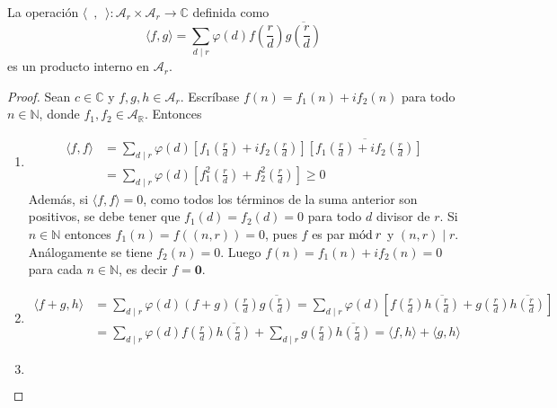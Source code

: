 \begin{proposition}
La operación $\langle \phantom{f},\phantom{g} \rangle : \mathcal{A}_r\times \mathcal{A}_r \longrightarrow \mathbb{C}$ definida como
\begin{equation*}
    \langle f,g \rangle = \sum_{d \mid r} \varphi(d) f \left( \frac{r}{d} \right) \overline{g \left( \frac{r}{d} \right)}
\end{equation*}
es un producto interno en $\mathcal{A}_r$.
\end{proposition}
\begin{proof}
Sean $c \in \mathbb{C}$ y $f,g,h \in \mathcal{A}_r$. Escríbase $f(n)=f_1(n)+ i f_2(n)$ para todo $n \in \mathbb{N}$, donde $f_1,f_2 \in \mathcal{A}_{\mathbb{R}}$. Entonces
\begin{enumerate}[label=\textnormal{(\roman*)}]
\item \begin{align*}
        \langle f,f \rangle & = \sum_{d \mid r} \varphi(d) \left[ f_1 \left( \frac{r}{d} \right) + i f_2 \left( \frac{r}{d} \right) \right] \overline{\left[ f_1 \left( \frac{r}{d} \right) + i f_2 \left( \frac{r}{d} \right) \right]} \\
                            & = \sum_{d \mid r} \varphi(d) \left[ f_1^2 \left( \frac{r}{d} \right) + f_2^2 \left( \frac{r}{d} \right) \right] \ge 0
\end{align*}
Además, si $\langle f,f \rangle=0$, como todos los términos de la suma anterior son positivos, se debe tener que $f_1(d)=f_2(d)=0$ para todo $d$ divisor de $r$. Si $n \in \mathbb{N}$ entonces $f_1(n)=f((n,r))=0$, pues $f$ es par $\mathrm{m\acute{o}d\:}r$ y $(n,r) \mid r$. Análogamente se tiene $f_2(n)=0$. Luego $f(n)=f_1(n)+i f_2(n)=0$ para cada $n \in \mathbb{N}$, es decir $f=\mathbf{0}$.
\item \begin{align*}
        \langle f+g,h \rangle & = \sum_{d \mid r} \varphi(d) (f+g) \left( \frac{r}{d} \right) \overline{g \left( \frac{r}{d} \right)} = \sum_{d \mid r} \varphi(d) \left[ f \left( \frac{r}{d} \right) \overline{h \left( \frac{r}{d} \right)} + g \left( \frac{r}{d} \right) \overline{h \left( \frac{r}{d} \right)} \right] \\
                              & = \sum_{d \mid r} \varphi(d) f \left( \frac{r}{d} \right) \overline{h \left( \frac{r}{d} \right)} + \sum_{d \mid r} g \left( \frac{r}{d} \right) \overline{h \left( \frac{r}{d} \right)} = \langle f,h \rangle + \langle g,h \rangle
\end{align*}
\item \begin{equation*}

\end{equation*}
\end{enumerate}
\end{proof}
